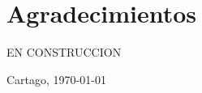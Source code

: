 \chapter*{Agradecimientos}
\thispagestyle{empty}

EN CONSTRUCCION

\vspace*{1cm}

\scriptAuthor

Cartago, \today

\cleardoublepage

